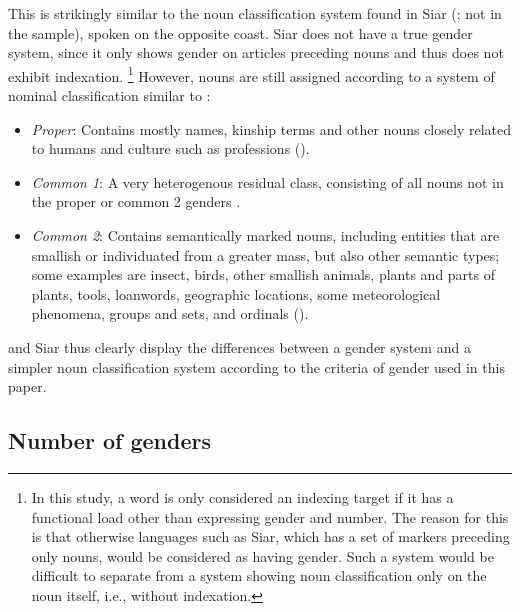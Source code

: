 \documentclass[output=collectionpaper]{langsci/langscibook}
\begin{document}
This is strikingly similar to the noun classification system found in Siar (\citealt{Frowein2011}; not in the sample), spoken on the opposite coast. Siar does not have a true gender system, since it only shows gender on articles preceding nouns and thus does not exhibit indexation.%
\footnote{In this study, a word is only considered an indexing target if it has a functional load other than expressing gender and number. The reason for this is that otherwise languages such as Siar, which has a set of markers preceding only nouns, would be considered as having gender. Such a system would be difficult to separate from a system showing noun classification only on the noun itself, i.e., without indexation.} %
However, nouns are still assigned according to a system of nominal classification similar to :

\begin{itemize}
\item \textit{Proper}: Contains mostly names, kinship terms and other nouns closely related to humans and culture such as professions (\citealt[104--105]{Frowein2011}).

\item \textit{Common 1}: A very heterogenous residual class, consisting of all nouns not in the proper or common 2 genders \citep[108]{Frowein2011}.

\item \textit{Common 2}: Contains semantically marked nouns, including entities that are smallish or individuated from a greater mass, but also other semantic types; some examples are insect, birds, other smallish animals, plants and parts of plants, tools, loanwords, geographic locations, some meteorological phenomena, groups and sets, and ordinals (\citealt[105--107]{Frowein2011}).
\end{itemize}

 and Siar thus clearly display the differences between a gender system and a simpler noun classification system according to the criteria of gender used in this paper.

\subsection{Number of genders}
\label{sec:Svard:3.2}
\end{document}
